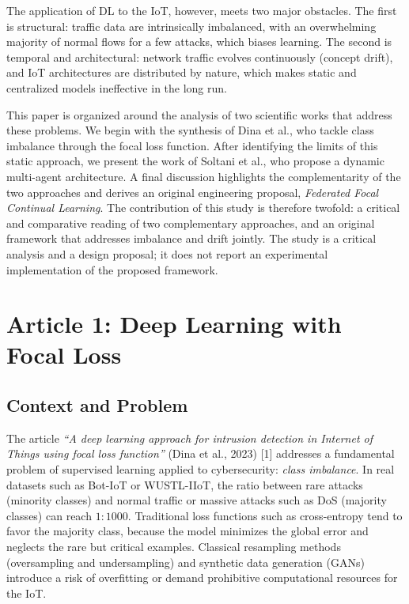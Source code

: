 \documentclass[11pt,a4paper]{article}
\begin{document}
The application of DL to the IoT, however, meets two major obstacles. The first is structural: traffic data are intrinsically imbalanced, with an overwhelming majority of normal flows for a few attacks, which biases learning. The second is temporal and architectural: network traffic evolves continuously (concept drift), and IoT architectures are distributed by nature, which makes static and centralized models ineffective in the long run.

This paper is organized around the analysis of two scientific works that address these problems. We begin with the synthesis of Dina et al., who tackle class imbalance through the focal loss function. After identifying the limits of this static approach, we present the work of Soltani et al., who propose a dynamic multi-agent architecture. A final discussion highlights the complementarity of the two approaches and derives an original engineering proposal, \emph{Federated Focal Continual Learning}. The contribution of this study is therefore twofold: a critical and comparative reading of two complementary approaches, and an original framework that addresses imbalance and drift jointly. The study is a critical analysis and a design proposal; it does not report an experimental implementation of the proposed framework.

\section{Article 1: Deep Learning with Focal Loss}

\subsection{Context and Problem}

The article \emph{``A deep learning approach for intrusion detection in Internet of Things using focal loss function''} (Dina et al., 2023) [1] addresses a fundamental problem of supervised learning applied to cybersecurity: \emph{class imbalance}. In real datasets such as Bot-IoT or WUSTL-IIoT, the ratio between rare attacks (minority classes) and normal traffic or massive attacks such as DoS (majority classes) can reach $1{:}1000$. Traditional loss functions such as cross-entropy tend to favor the majority class, because the model minimizes the global error and neglects the rare but critical examples. Classical resampling methods (oversampling and undersampling) and synthetic data generation (GANs) introduce a risk of overfitting or demand prohibitive computational resources for the IoT.
\end{document}
